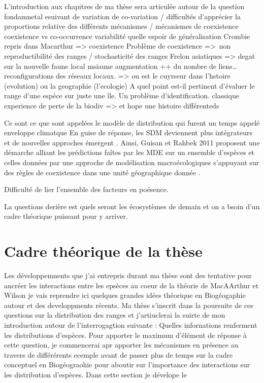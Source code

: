 L'introduction aux chapitres de ma thèse sera articulée autour de la
question fondamnetal esuivant de variation de co-variation / difficultés
d'apprécier la proportions relative des différents mécanismes /
mécanismes de coexistence coexistence vs co-occurrence variabilité
quelle espoir de généralisation Crombie repris dans Macarthur
=\textgreater{} coexistence Problème de coexistence =\textgreater{}~non
reproductibilité des ranges / stochasticité des ranges Frelon asiatiques
=\textgreater{} degat sur la nouvelle faune local msiaune augmentation
++ du nombre de liens\ldots{} reconfigurations des réseaux locaux.
=\textgreater{} ou est le cuyrseur dans l'hstoire (evolution) ou la
geographie (l'ecologie) A quel point est-il pertinent d'évaluer le range
d'une espèce sur juste une île. Un problème d'identification. classique
experience de perte de la biodiv =\textgreater{} et hope une histoire
différenteds

Ce sont ce que sont appelées le modèle de distribution qui furent un
temps appelé enveloppe climatque En guise de réponse, les SDM deviennent
plus intégrateurs et de nouvelles approches émergent
\cite{Kissling2011}. Ainsi, Guisan et Rahbek 2011 proposent une démarche
alliant les prédictions faîtes par les MDE sur un ensemble d'espèces et
celles données par une approche de modélisation macroécologiques
s'appuyant sur des règles de coexistence dans une unité géographique
donnée \cite{Guisan2011}.

Difficulté de lier l'ensemble des facteurs en poésence.

La questions derière est quels seront les écosystèmes de demain et on a
bsoin d'un cadre théorique puissant pour y arriver.

\section*{Cadre théorique de la
thèse}\label{cadre-thuxe9orique-de-la-thuxe8se}

Les développemnents que j'ai entrepris durant ma thèse sont des
tentative pour ancréer les interactions entre les epsèces au coeur de la
théorie de MacAArthur et Wilson je vais reprendre ici quelques grandes
idées théorique en Biogéogaphie autour et des developpments récents. Ma
thèse s'inscrit dans la poursuite de ces questions sur la distribution
des ranges et j'artiuclerai la suirte de mon introduction autour de
l'interrogagtion suivante : Quelles infornations renferment les
distributions d'espèces. Pour apporter le maximum d'élément de réponse à
cette question, je commencerai apr apporter les mécanismes en présence
au travers de différérents ecemple avant de passer plus de temps sur la
cadre conceptuel en Biogéograohie pour aboutir sur l'importance des
interactions sur les distribution d'espèces. Dans cette section je
dévelope le

